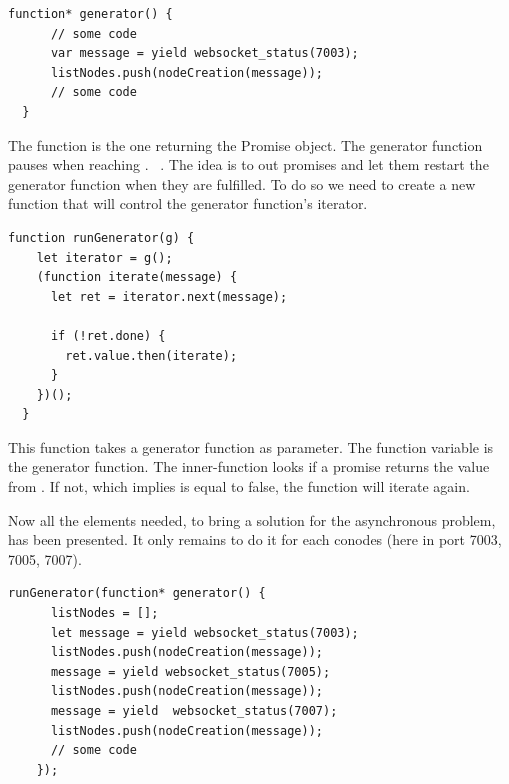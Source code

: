 \documentclass[11pt, a4paper, twoside, openright, openany]{article} %
\begin{document}
\begin{lstlisting}[caption={Extract from the project's code}, captionpos=b]
  function* generator() {
      // some code
      var message = yield websocket_status(7003);
      listNodes.push(nodeCreation(message));
      // some code
  }
\end{lstlisting}
\leavevmode \newline

The function  is the one returning the Promise object. The generator function
pauses when reaching . ~\cite{runGenerator}.
The idea is to  out promises and let them restart the generator function when
they are fulfilled. To do so we need to create a new function that will control the generator function's iterator.
\bigbreak

\begin{lstlisting}[caption={Extract from the project's code~\cite{runGenerator}}, captionpos=b]
  function runGenerator(g) {
    let iterator = g();
    (function iterate(message) {
      let ret = iterator.next(message);

      if (!ret.done) {
        ret.value.then(iterate);
      }
    })();
  }
\end{lstlisting}
\leavevmode \newline

This function takes a generator function as parameter. The  function
variable is the generator function. The inner-function  looks if
a promise returns the value  from .
If not, which implies  is equal to false, the function will iterate again.

Now all the elements needed, to bring a solution for the asynchronous problem, has
been presented. It only remains to do it for each conodes (here in port 7003, 7005, 7007).
\bigbreak

\begin{lstlisting}[caption={Extract from the project's code reaching conodes at port 7003, 7005 and 7007}, captionpos=b]
  runGenerator(function* generator() {
      listNodes = [];
      let message = yield websocket_status(7003);
      listNodes.push(nodeCreation(message));
      message = yield websocket_status(7005);
      listNodes.push(nodeCreation(message));
      message = yield  websocket_status(7007);
      listNodes.push(nodeCreation(message));
      // some code
    });
\end{lstlisting}
\leavevmode \newline
\end{document}
